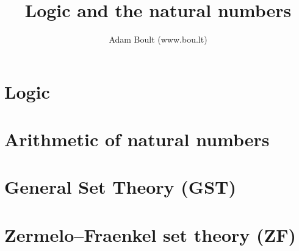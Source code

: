 \documentclass[oneside]{book}
\begin{document}
\author{Adam Boult (www.bou.lt)}
\title{Logic and the natural numbers}
\maketitle

\setcounter{tocdepth}{0}
\tableofcontents



\part{Logic}






\part{Arithmetic of natural numbers}













\part{General Set Theory (GST)}






\part{Zermelo–Fraenkel set theory (ZF)}




\end{document}
